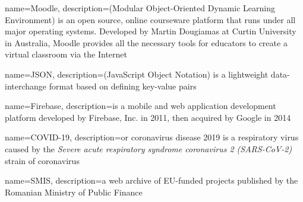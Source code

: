 {
        name=Moodle,
        description={(Modular Object-Oriented Dynamic Learning Environment) is an open source, online courseware platform that runs under all major operating systems. Developed by Martin Dougiamas at Curtin University in Australia, Moodle provides all the necessary tools for educators to create a virtual classroom via the Internet \cite{crosslin2010course}}
}

{
        name=JSON,
        description={(JavaScript Object Notation) is a lightweight data-interchange format based on defining key-value pairs}
}

{
        name=Firebase,
        description={is a mobile and web application development platform developed by Firebase, Inc. in 2011, then acquired by Google in 2014}
}

{
        name=COVID-19,
        description={or coronavirus disease 2019 is a respiratory virus caused by the \textit{Severe acute respiratory syndrome coronavirus 2 (SARS-CoV-2)} strain of coronavirus}
}

{
        name=SMIS,
        description=a web archive of EU-funded projects published by the Romanian Ministry of Public Finance
}